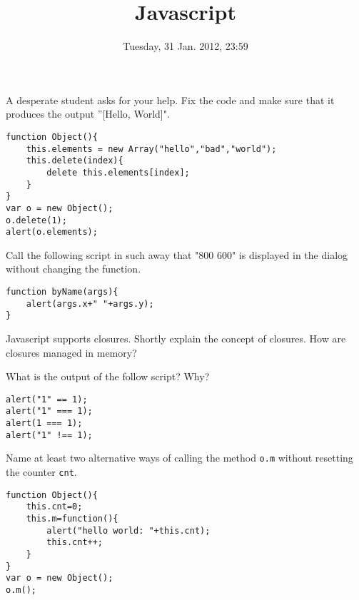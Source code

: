 \documentclass{./handout}
\title{Javascript}
\date{Tuesday, 31 Jan. 2012, 23:59} %
\begin{document}
\maketitle



\begin{subtask}
A desperate student asks for your help. Fix the code and make sure that it produces the output ''[Hello, World]".
\begin{lstlisting}
function Object(){
	this.elements = new Array("hello","bad","world");
	this.delete(index){
		delete this.elements[index];
	}
}
var o = new Object();
o.delete(1);
alert(o.elements);
\end{lstlisting}
\end{subtask}


\begin{subtask}
Call the following script in such away that "800 600" is displayed in the dialog without changing the function.
\begin{lstlisting}
function byName(args){
	alert(args.x+" "+args.y);
}
\end{lstlisting}
\end{subtask}

\begin{subtask}
Javascript supports closures. Shortly explain the concept of closures. How are closures managed in memory?
\end{subtask}

\begin{subtask}
What is the output of the follow script? Why?
\begin{lstlisting}
alert("1" == 1);
alert("1" === 1);
alert(1 === 1);
alert("1" !== 1);
\end{lstlisting}
\end{subtask}

\begin{subtask}
Name at least two alternative ways of calling the method \texttt{o.m} without resetting the counter \texttt{cnt}.
\begin{lstlisting}
function Object(){
	this.cnt=0;
	this.m=function(){
		alert("hello world: "+this.cnt);
		this.cnt++;
	}
} 
var o = new Object();
o.m();
\end{lstlisting}
\end{subtask}
\end{document}
